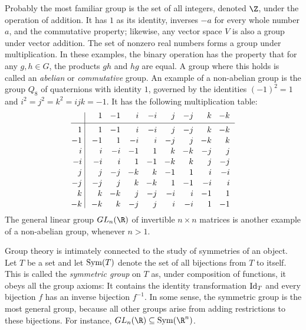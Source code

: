 Probably the most familiar group is the set of all integers, denoted $\Z$, under the operation of addition. It has $1$ as its identity, inverses $-a$ for every whole number $a$, and the commutative property; likewise, any vector space $V$ is also a group under vector addition. The set of nonzero real numbers forms a group under multiplication. In these examples, the binary operation has the property that for any $g,h\in G$, the products $gh$ and $hg$ are equal. A group where this holds is called an {\it abelian} or {\it commutative} group. An example of a non-abelian group is the group $Q_8$ of quaternions with identity $1$, governed by the identities $(-1)^2 = 1$ and $i^2 = j^2 = k^2 = ijk = -1$. It has the following multiplication table:
$$\vcenter{\vbox{\offinterlineskip
    \halign{
        \hfil $#$ & \hfil\vrule# \hfil \enskip &
        \hfil $\;#\;$ & \hfil $\;#\;$ & \hfil $\;#\;$ & \hfil $\;#\;$ &
        \hfil $\;#\;$ & \hfil $\;#\;$ & \hfil $\;#\;$ & \hfil $\;#\;$ \cr
        && 1 & -1 & i & -i & j & -j & k & - k \cr
        & height4pt &&&&&&& \cr
        \noalign{\hrule}
        & height4pt &&&&&&& \cr
        1 && 1 & -1 & i & -i & j & -j & k & - k \cr
        & height4pt &&&&&&& \cr
        -1 && -1 & 1 & -i & i & -j & j & -k & k \cr
        & height4pt &&&&&&& \cr
        i && i & -i & -1 & 1 & k & -k & -j & j \cr
        & height4pt &&&&&&& \cr
        -i && -i & i & 1 & -1 & -k & k & j & -j \cr
        & height4pt &&&&&&& \cr
        j && j & -j & -k & k & -1 & 1 & i & -i \cr
        & height4pt &&&&&&& \cr
        -j && -j & j & k & -k & 1 & -1 & -i & i \cr
        & height4pt &&&&&&& \cr
        k && k & -k & j & -j & -i & i & -1 & 1 \cr
        & height4pt &&&&&&& \cr
        -k && -k & k & -j & j & i & -i & 1 & -1 \cr
    }
}}$$
The general linear group $GL_n(\R)$ of invertible $n\times n$ matrices is another example of a non-abelian group, whenever $n>1$.

Group theory is intimately connected to the study of symmetries of an object. Let $T$ be a set and let $\mathop{\rm Sym}\nolimits(T)$ denote the set of all bijections from $T$ to itself. This is called the {\it symmetric group} on $T$ as, under composition of functions, it obeys all the group axioms: It contains the identity transformation $\mathop{\rm Id}\nolimits_T$ and every bijection $f$ has an inverse bijection $f^{-1}$. In some sense, the symmetric group is the most general group, because all other groups arise from adding restrictions to these bijections. For instance, $GL_n(\R) \subseteq \Sym(\R^n)$.

